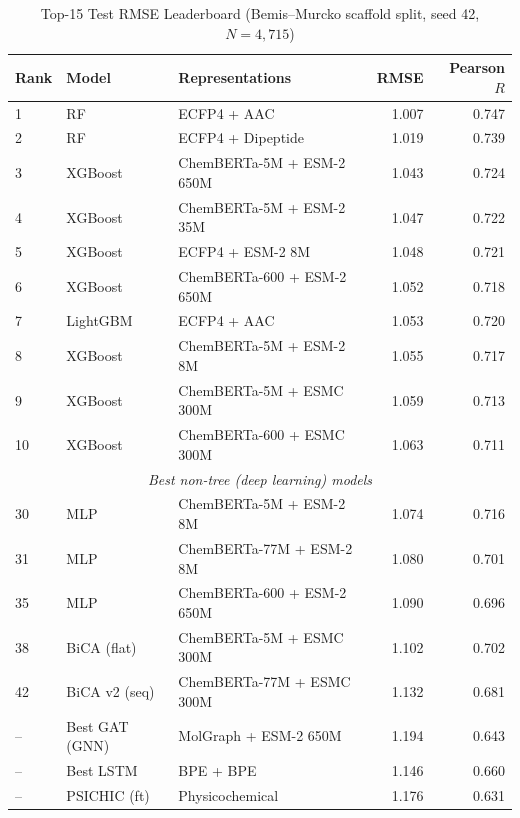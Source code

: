 \documentclass[pmlr,twocolumn]{jmlr}
\begin{document}
\begin{table}[t]
\centering
\small
\caption{Top-15 Test RMSE Leaderboard (Bemis--Murcko scaffold split, seed 42, $N=4{,}715$)}
\label{tab:leaderboard}
\begin{tabular}{lllrr}
\toprule
\textbf{Rank} & \textbf{Model} & \textbf{Representations} & \textbf{RMSE} & \textbf{Pearson $R$} \\
\midrule
 1 & RF              & ECFP4 + AAC                  & 1.007 & 0.747 \\
 2 & RF              & ECFP4 + Dipeptide            & 1.019 & 0.739 \\
 3 & XGBoost         & ChemBERTa-5M + ESM-2 650M    & 1.043 & 0.724 \\
 4 & XGBoost         & ChemBERTa-5M + ESM-2 35M     & 1.047 & 0.722 \\
 5 & XGBoost         & ECFP4 + ESM-2 8M             & 1.048 & 0.721 \\
 6 & XGBoost         & ChemBERTa-600 + ESM-2 650M   & 1.052 & 0.718 \\
 7 & LightGBM        & ECFP4 + AAC                  & 1.053 & 0.720 \\
 8 & XGBoost         & ChemBERTa-5M + ESM-2 8M      & 1.055 & 0.717 \\
 9 & XGBoost         & ChemBERTa-5M + ESMC 300M     & 1.059 & 0.713 \\
10 & XGBoost         & ChemBERTa-600 + ESMC 300M    & 1.063 & 0.711 \\
\midrule
\multicolumn{5}{c}{\textit{Best non-tree (deep learning) models}} \\
30 & MLP             & ChemBERTa-5M + ESM-2 8M       & 1.074 & 0.716 \\
31 & MLP             & ChemBERTa-77M + ESM-2 8M      & 1.080 & 0.701 \\
35 & MLP             & ChemBERTa-600 + ESM-2 650M    & 1.090 & 0.696 \\
38 & BiCA (flat)     & ChemBERTa-5M + ESMC 300M      & 1.102 & 0.702 \\
42 & BiCA v2 (seq)   & ChemBERTa-77M + ESMC 300M     & 1.132 & 0.681 \\
-- & Best GAT (GNN)  & MolGraph + ESM-2 650M         & 1.194 & 0.643 \\
-- & Best LSTM        & BPE + BPE                    & 1.146 & 0.660 \\
-- & PSICHIC (ft)    & Physicochemical               & 1.176 & 0.631 \\
\bottomrule
\end{tabular}
\end{table}
\end{document}
